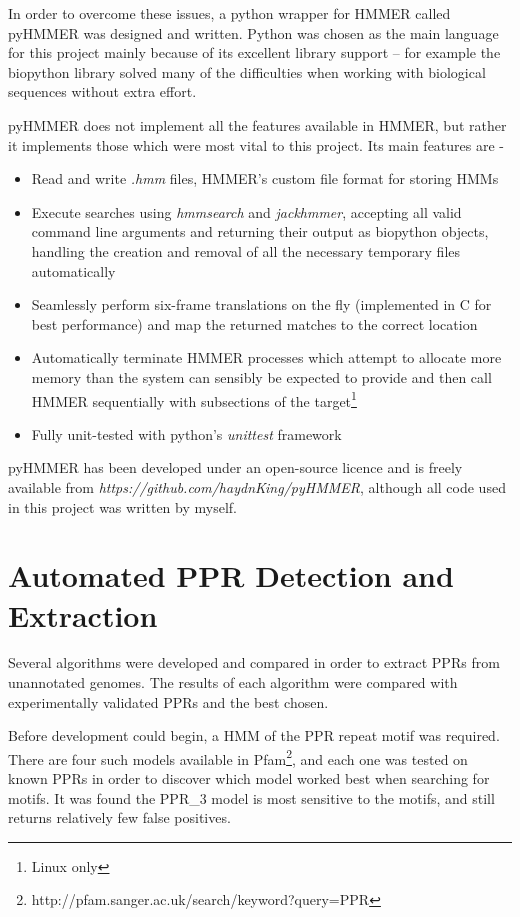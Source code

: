In order to overcome these issues, a python wrapper for HMMER called
pyHMMER was designed and written.
Python was chosen as the main language for this project mainly because of its
excellent library support -- for example the biopython library solved many of 
the difficulties when working with biological sequences without extra effort.

pyHMMER does not implement all the features available in HMMER, but rather it
implements those which were most vital to this project.
Its main features are -
\begin{itemize}
  \item Read and write \emph{.hmm} files, HMMER's custom file format for
    storing HMMs
  \item Execute searches using 
    \emph{hmmsearch} and \emph{jackhmmer}, accepting all valid command line
    arguments and returning their output as biopython objects, 
    handling the creation and removal of all the necessary 
    temporary files automatically
  \item Seamlessly perform six-frame translations on the fly (implemented in C
    for best performance)
    and map the returned matches to the correct location
  \item Automatically terminate HMMER processes which attempt to allocate more
    memory than the system can sensibly be expected to provide and then call
    HMMER sequentially with subsections of the target\footnote{Linux only}
  \item Fully unit-tested with python's \emph{unittest} framework
\end{itemize}
pyHMMER has been developed under an open-source licence and is freely available
from \emph{https://github.com/haydnKing/pyHMMER}, although all code used in
this project was written by myself.


\section{Automated PPR Detection and Extraction}
\label{sec:ppr_extraction}

Several algorithms were developed and compared in order to extract PPRs from
unannotated genomes.
The results of each algorithm were compared with experimentally validated PPRs
and the best chosen.

Before development could begin, a HMM of the PPR repeat motif was required.
There are four such models available in
Pfam\footnote{http://pfam.sanger.ac.uk/search/keyword?query=PPR}, and each one
was tested on known PPRs in order to discover which model worked best when
searching for motifs.
It was found the PPR\_3 model is most sensitive to the motifs, and still
returns relatively few false positives.

